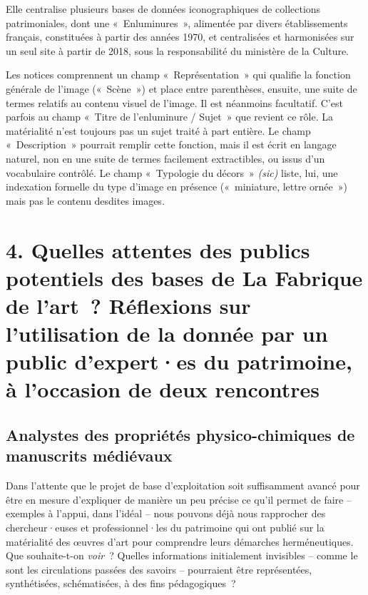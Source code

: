 \documentclass[a4paper,12pt, twoside]{book}
\begin{document}
Elle centralise plusieurs bases de données iconographiques de collections patrimoniales, dont une «~Enluminures~», alimentée par divers établissements français, constituées à partir des années 1970, et centralisées et harmonisées sur un seul site à partir de 2018, sous la responsabilité du ministère de la Culture.

Les notices comprennent un champ «~Représentation~» qui qualifie la fonction générale de l’image («~Scène~») et place entre parenthèses, ensuite, une suite de termes relatifs au contenu visuel de l’image. Il est néanmoins facultatif. C’est parfois au champ «~Titre de l’enluminure / Sujet~» que revient ce rôle. La matérialité n’est toujours pas un sujet traité à part entière. Le champ «~Description~» pourrait remplir cette fonction, mais il est écrit en langage naturel, non en une suite de termes facilement extractibles, ou issus d’un vocabulaire contrôlé. Le champ «~Typologie du décors~» \textit{(sic)} liste, lui, une indexation formelle du type d’image en présence («~miniature, lettre ornée~») mais pas le contenu desdites images.

\clearemptydoublepage
\chapter*{4. Quelles attentes des publics potentiels des bases de La Fabrique de l’art~? Réflexions sur l’utilisation de la donnée par un public d’expert·es du patrimoine, à l’occasion de deux rencontres}

\section*{Analystes des propriétés physico-chimiques de manuscrits médiévaux}

Dans l’attente que le projet de base d’exploitation soit suffisamment avancé pour être en mesure d’expliquer de manière un peu précise ce qu’il permet de faire – exemples à l’appui, dans l’idéal – nous pouvons déjà nous rapprocher des chercheur·euses et professionnel·les du patrimoine qui ont publié sur la matérialité des œuvres d’art pour comprendre leurs démarches herméneutiques. Que souhaite-t-on \textit{voir}~? Quelles informations initialement invisibles – comme le sont les circulations passées des savoirs – pourraient être représentées, synthétisées, schématisées, à des fins pédagogiques~?
\end{document}
